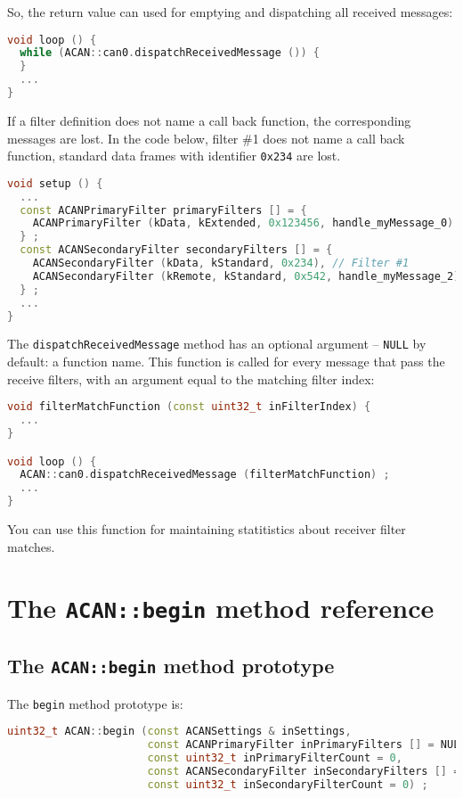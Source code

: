 \documentclass[10pt, a4paper, obeyspaces, openany]{extarticle}
\newcommand \sectionLabel[2]{\section{#1}\label{sec:#2}}
\begin{document}
So, the return value can used for emptying and dispatching all received messages:
{ \small\begin{lstlisting}[language=c++]
void loop () {
  while (ACAN::can0.dispatchReceivedMessage ()) {
  }
  ...
}
\end{lstlisting}}

If a filter definition does not name a call back function, the corresponding messages are lost. In the code below, filter \#1 does not name a call back function, standard data frames with identifier \texttt{0x234} are lost.

{ \small\begin{lstlisting}[language=c++]
void setup () {
  ...
  const ACANPrimaryFilter primaryFilters [] = {
    ACANPrimaryFilter (kData, kExtended, 0x123456, handle_myMessage_0)
  } ;
  const ACANSecondaryFilter secondaryFilters [] = {
    ACANSecondaryFilter (kData, kStandard, 0x234), // Filter #1
    ACANSecondaryFilter (kRemote, kStandard, 0x542, handle_myMessage_2)
  } ;
  ...
}
\end{lstlisting}}


The \texttt{dispatchReceivedMessage} method has an optional argument -- \texttt{NULL} by default: a function name. This function is called for every message that pass the receive filters, with an argument equal to the matching filter index:

{ \small\begin{lstlisting}[language=c++]
void filterMatchFunction (const uint32_t inFilterIndex) {
  ...
}

void loop () {
  ACAN::can0.dispatchReceivedMessage (filterMatchFunction) ;
  ...
}
\end{lstlisting}}

You can use this function for maintaining statitistics about receiver filter matches.


\sectionLabel{The \texttt{ACAN::begin} method reference}{beginMethodReference}

\subsection{The \texttt{ACAN::begin} method prototype}

The \texttt{begin} method prototype is:
{ \small\begin{lstlisting}[language=c++]
uint32_t ACAN::begin (const ACANSettings & inSettings,
                      const ACANPrimaryFilter inPrimaryFilters [] = NULL,
                      const uint32_t inPrimaryFilterCount = 0,
                      const ACANSecondaryFilter inSecondaryFilters [] = NULL,
                      const uint32_t inSecondaryFilterCount = 0) ;
\end{lstlisting}}
\end{document}
